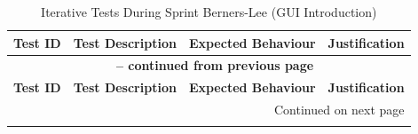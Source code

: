 \begin{longtable}{|p{}|p{}|p{}|p{}|}
	\caption{Iterative Tests During Sprint Berners-Lee (GUI Introduction)} \label{tab:sprint_bernerslee_tests_lt_rev} \\
	\hline
	\textbf{Test ID} & \textbf{Test Description} & \textbf{Expected Behaviour} & \textbf{Justification} \\
	\hline
	\endfirsthead
	\multicolumn{4}{c}{{\bfseries \tablename\ \thetable{} -- continued from previous page}} \\ \hline
	\textbf{Test ID} & \textbf{Test Description} & \textbf{Expected Behaviour} & \textbf{Justification} \\ \hline \endhead
	\hline \multicolumn{4}{r}{{Continued on next page}} \\ \endfoot \hline \endlastfoot
	

\end{longtable}
